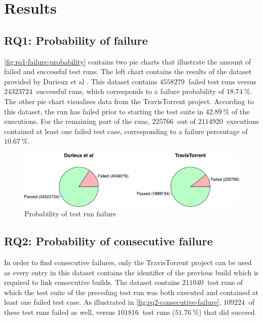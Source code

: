 
\section{Results}

\subsection{RQ1: Probability of failure}\label{ssec:results-rq1}
\autoref{fig:rq1-failure-probability} contains two pie charts that illustrate the amount of failed and successful test runs. The left chart contains the results of the dataset provided by Durieux et al \cite{travisanalysis}. This dataset contains $\SI{4558279}{}$ failed test runs versus $\SI{24323724}{}$ successful runs, which corresponds to a failure probability of $\SI{18.74}{\percent}$. The other pie chart visualises data from the TravisTorrent project. According to this dataset, the run has failed prior to starting the test suite in $\SI{42.89}{\percent}$ of the executions. For the remaining part of the runs, $\SI{225766}{}$ out of $\SI{2114920}{}$ executions contained at least one failed test case, corresponding to a failure percentage of $\SI{10.67}{\percent}$.

\begin{figure}[htbp!]
	\centering
	\includegraphics[width=\textwidth]{assets/charts/rq1-failure-probability.pdf}
	\caption{Probability of test run failure}
	\label{fig:rq1-failure-probability}
\end{figure}

\subsection{RQ2: Probability of consecutive failure}
In order to find consecutive failures, only the TravisTorrent project can be used as every entry in this dataset contains the identifier of the previous build which is required to link consecutive builds. The dataset contains $\SI{211040}{}$ test runs of which the test suite of the preceding test run was both executed and contained at least one failed test case. As illustrated in \autoref{fig:rq2-consecutive-failure}, $\SI{109224}{}$ of these test runs failed as well, versus $\SI{101816}{}$ test runs ($\SI{51.76}{\percent}$) that did succeed.


